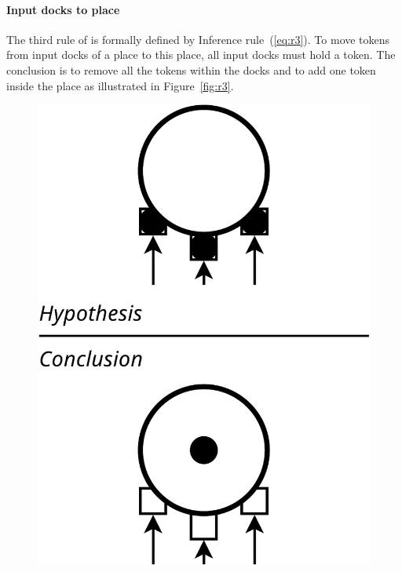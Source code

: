 \paragraph{Input docks to place}{

The third rule of \mad is formally defined by
Inference rule~(\ref{eq:r3}). To move tokens from input docks of a place to
this place, all input docks must hold a token. The conclusion is to remove
all the tokens within the docks and to add one token inside the
place as illustrated in Figure~\ref{fig:r3}.

\begin{figure}[t]

\begin{minipage}[h]{0.45\columnwidth}%
  \centering
  \includegraphics[width=0.65\columnwidth]{./images/inputdocks_to_place.pdf}
\end{minipage}
\hfill
\begin{minipage}[h]{0.45\columnwidth}%
  \centering

\end{minipage}
\end{figure}}
